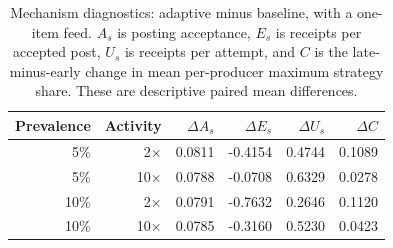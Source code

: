 \begin{table}[!htbp]
\caption{Mechanism diagnostics: adaptive minus baseline, with a one-item feed. $A_s$ is posting acceptance, $E_s$ is receipts per accepted post, $U_s$ is receipts per attempt, and $C$ is the late-minus-early change in mean per-producer maximum strategy share. These are descriptive paired mean differences.}
\label{tab:adaptive-diagnostics}
\centering\small
\begin{tabular}{rrrrrr}
\hline
Prevalence & Activity & $\Delta A_s$ & $\Delta E_s$ & $\Delta U_s$ & $\Delta C$ \\
\hline
5\% & 2$\times$ & 0.0811 & -0.4154 & 0.4744 & 0.1089 \\
5\% & 10$\times$ & 0.0788 & -0.0708 & 0.6329 & 0.0278 \\
10\% & 2$\times$ & 0.0791 & -0.7632 & 0.2646 & 0.1120 \\
10\% & 10$\times$ & 0.0785 & -0.3160 & 0.5230 & 0.0423 \\
\hline
\end{tabular}
\end{table}
